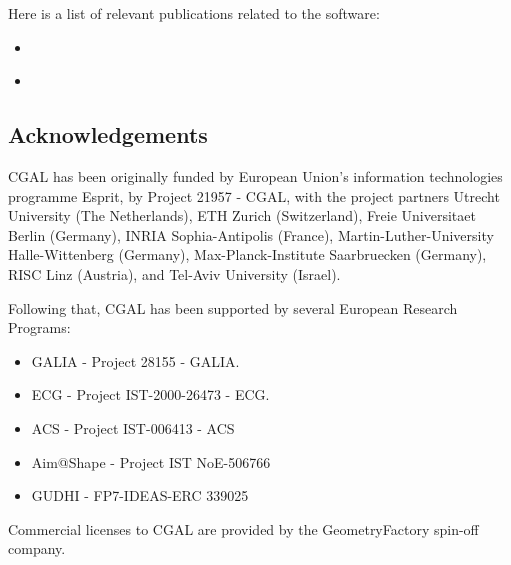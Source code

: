 Here is a list of relevant publications related to the software:


\begin{itemize}
\item \cite{jamin_cgalmesh_2015}
\item \cite{portaneri_alpha_2022}
\end{itemize}


\subsection{Acknowledgements}
\label{sec::CGAL:acknowledgements}

%
%



CGAL has been originally funded by European Union's information technologies programme Esprit, by Project 21957 - CGAL, 
with the project partners Utrecht University (The Netherlands), ETH Zurich (Switzerland), Freie Universitaet Berlin (Germany), 
INRIA Sophia-Antipolis (France), Martin-Luther-University Halle-Wittenberg (Germany), Max-Planck-Institute Saarbruecken (Germany), 
RISC Linz (Austria), and Tel-Aviv University (Israel).

Following that, CGAL has been supported by several European Research Programs:
\begin{itemize}
\item GALIA - Project 28155 - GALIA.
\item ECG -  Project IST-2000-26473 - ECG.
\item ACS - Project IST-006413 - ACS
\item Aim@Shape - Project IST NoE-506766
\item GUDHI - FP7-IDEAS-ERC 339025
\end{itemize}

Commercial licenses to CGAL are provided by the GeometryFactory spin-off company.


